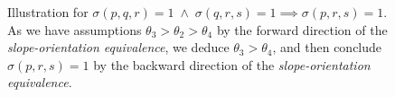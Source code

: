\begin{figure}
  \caption{Illustration for $\sigma(p,q,r) = 1 \; \land \; \sigma(q,r,s) = 1 \implies \sigma(p, r, s) = 1$. As we have assumptions $\theta_3 > \theta_2 > \theta_4$  by the forward direction of the \emph{slope-orientation equivalence}, we deduce $\theta_3 > \theta_4$, and then conclude $\sigma(p, r, s) = 1$ by the backward direction of the \emph{slope-orientation equivalence}.  }\label{fig:orientation-implication}
\end{figure}
